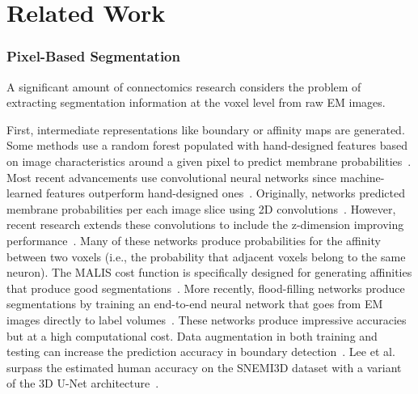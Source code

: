 
\section{Related Work}


\subsubsection{Pixel-Based Segmentation}
A significant amount of connectomics research considers the problem of extracting segmentation information at the voxel level from raw EM images.

First, intermediate representations like boundary or affinity maps are generated. Some methods use a random forest populated with hand-designed features based on image characteristics around a given pixel to predict membrane probabilities~\cite{kaynig2015large}.
Most recent advancements use convolutional neural networks since machine-learned features outperform hand-designed ones~\cite{bogovic2013learned}.
Originally, networks predicted membrane probabilities per each image slice using 2D convolutions~\cite{seymour2016rhoananet,ronneberger2015u,ciresan2012deep,jain2010boundary,kaynig2015large,amelio_segmentation}.
However, recent research extends these convolutions to include the z-dimension improving performance~\cite{lee2015recursive,parag2017anisotropic,cciccek20163d,turaga2010convolutional}.
Many of these networks produce probabilities for the affinity between two voxels (i.e., the probability that adjacent voxels belong to the same neuron). 
The MALIS cost function is specifically designed for generating affinities that produce good segmentations~\cite{briggman2009maximin}. 
More recently, flood-filling networks produce segmentations by training an end-to-end neural network that goes from EM images directly to label volumes~\cite{januszewski2016flood}. 
These networks produce impressive accuracies but at a high computational cost.
Data augmentation in both training and testing can increase the prediction accuracy in boundary detection~\cite{zeng2017deepem3d}.
Lee et al. surpass the estimated human accuracy on the SNEMI3D dataset with a variant of the 3D U-Net architecture~\cite{lee2017superhuman}.

